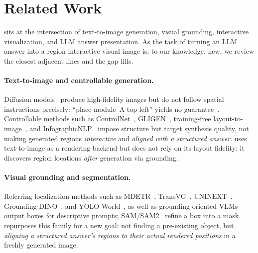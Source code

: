 \section{Related Work}
\label{sec:related_work}

\method{} sits at the intersection of text-to-image generation, visual
grounding, interactive visualization, and LLM answer presentation. As the task
of turning an LLM answer into a region-interactive visual image is, to our
knowledge, new, we review the closest adjacent lines and the gap \method{} fills.

\paragraph{Text-to-image and controllable generation.}
Diffusion models~\citep{ramesh2022dalle2,saharia2022imagen,rombach2022ldm,podell2024sdxl}
produce high-fidelity images but do not follow spatial instructions precisely:
``place module~A top-left'' yields no guarantee~\citep{feng2023layoutgpt,cheng2024intelligent}.
Controllable methods such as ControlNet~\citep{zhang2023controlnet},
GLIGEN~\citep{li2023gligen}, training-free
layout-to-image~\citep{chen2024trainingfree},
and InfographicNLP~\citep{lu2023infographicnlp} impose structure but target
synthesis quality, not making generated regions \emph{interactive} and
\emph{aligned with a structured answer}. \method{} uses text-to-image as a
rendering backend but does not rely on its layout fidelity: it discovers
region locations \emph{after} generation via grounding.

\paragraph{Visual grounding and segmentation.}
\begin{sloppypar}
Referring localization methods such as MDETR~\citep{kamath2021mdetr},
TransVG~\citep{deng2021transvg}, UNINEXT~\citep{yan2023uninext}, Grounding
DINO~\citep{liu2024groundingdino}, and YOLO-World~\citep{cheng2024yoloworld},
as well as
grounding-oriented VLMs~\citep{nvidia2025locateanything,xiaomi2025mimovl,liu2023llava,chen2024internvl}
output boxes for descriptive prompts; SAM/SAM2~\citep{kirillov2023sam,ravi2024sam2}
refine a box into a mask. \method{} repurposes this family for a new goal: not
finding a pre-existing object, but \emph{aligning a structured answer's regions
to their actual rendered positions} in a freshly generated image.
\end{sloppypar}


